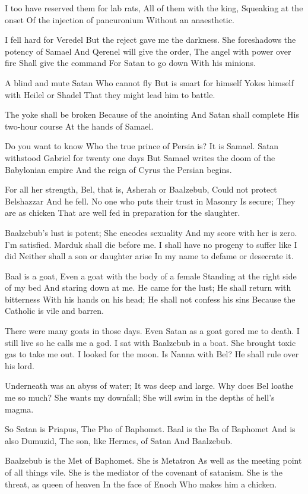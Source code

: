 \documentclass[
]{book}
\begin{document}
I too have reserved them for lab rats,
All of them with the king,
Squeaking at the onset
Of the injection of pancuronium
Without an anaesthetic.

I fell hard for Veredel
But the reject gave me the darkness.
She foreshadows the potency of Samael
And Qerenel will give the order,
The angel with power over fire
Shall give the command
For Satan to go down
With his minions.

A blind and mute Satan
Who cannot fly
But is smart for himself
Yokes himself with Heilel or Shadel
That they might lead him to battle.

The yoke shall be broken
Because of the anointing
And Satan shall complete
His two-hour course
At the hands of Samael.

Do you want to know
Who the true prince of Persia is?
It is Samael.
Satan withstood Gabriel for twenty one days
But Samael writes the doom of the Babylonian empire
And the reign of Cyrus the Persian begins.

For all her strength,
Bel, that is, Asherah or Baalzebub,
Could not protect Belshazzar
And he fell.
No one who puts their trust in Masonry
Is secure;
They are as chicken
That are well fed in preparation for the slaughter.

Baalzebub's lust is potent;
She encodes sexuality
And my score with her is zero.
I'm satisfied.
Marduk shall die before me.
I shall have no progeny to suffer like I did
Neither shall a son or daughter arise
In my name to defame or desecrate it.

Baal is a goat,
Even a goat with the body of a female
Standing at the right side of my bed
And staring down at me.
He came for the lust;
He shall return with bitterness
With his hands on his head;
He shall not confess his sins
Because the Catholic is vile and barren.

There were many goats in those days.
Even Satan as a goat gored me to death.
I still live so he calls me a god.
I sat with Baalzebub in a boat.
She brought toxic gas to take me out.
I looked for the moon.
Is Nanna with Bel?
He shall rule over his lord.

Underneath was an abyss of water;
It was deep and large.
Why does Bel loathe me so much?
She wants my downfall;
She will swim in the depths of hell's magma.

So Satan is Priapus,
The Pho of Baphomet.
Baal is the Ba of Baphomet
And is also Dumuzid,
The son, like Hermes, of Satan
And Baalzebub.

Baalzebub is the Met of Baphomet.
She is Metatron
As well as the meeting point of all things vile.
She is the mediator of the covenant of satanism.
She is the threat, as queen of heaven
In the face of Enoch
Who makes him a chicken.
\end{document}
